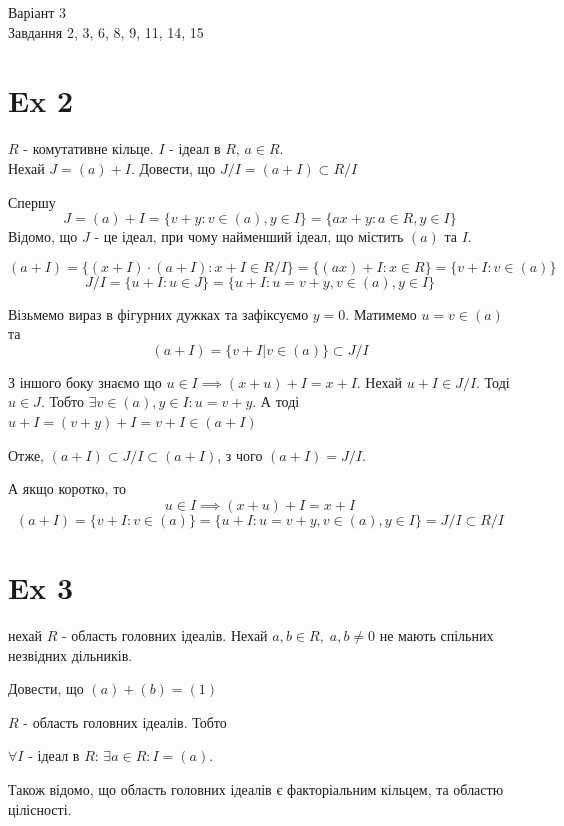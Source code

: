 \documentclass[11pt, a4paper]{article} %
\begin{document}
\begin{mdframed}[backgroundcolor=pink!30]
    Варіант 3\\
    Завдання 2, 3, 6, 8, 9, 11, 14, 15
\end{mdframed}

\section*{Ex 2}
\begin{mdframed}
    $R$ - комутативне кільце. $I$ - ідеал в $R$, $a\in R$.\\
    Нехай $J = (a) + I$. Довести, що $J/I = (a+I) \subset R/I$
\end{mdframed}
Спершу
\[J = (a) + I = \{v+y : v \in (a), y \in I\} = \{ax+y : a \in R, y \in I\}\]
Відомо, що $J$ - це ідеал, при чому найменший ідеал, що містить $(a)$ та $I$.

\[(a+I) = \{(x+I)\cdot (a+I) : x+I \in R/I\} = \{(ax)+I : x \in R\} = \{v+I : v \in (a)\}\]
\[J/I = \{u + I : u \in J\} = \{u + I : u = v+y, v \in (a), y \in I\} \]

Візьмемо вираз в фігурних дужках та зафіксуємо $y=0$. 
Матимемо $u = v \in (a)$ та 
\[(a+I) = \{v + I | v \in (a)\} \subset J/I\]

З іншого боку знаємо що $u\in I \implies (x+u) + I = x + I$.
Нехай $u+I \in J/I$.
Тоді $u \in J$. Тобто $\exists v \in (a), y \in I: u=v+y$. 
А тоді $u+I = (v + y) + I = v + I \in (a+I)$

Отже, $(a+I) \subset J/I \subset (a+I)$, з чого $(a+I) = J/I$.

А якщо коротко, то 
\[u\in I \implies (x+u) + I = x + I\]
\[(a+I) = \{v+I : v \in (a)\} = \{u+I : u = v + y, v \in (a), y \in I\} = J/I \subset R/I\]


\newpage
\section*{Ex 3}
\begin{mdframed}
    нехай $R$ - область головних ідеалів.
    Нехай $a,b\in R, \; a,b\ne 0$ не мають спільних незвідних дільників.
    
    Довести, що $(a)+(b)=(1)$
\end{mdframed}

\begin{mdframed}[backgroundcolor=purple!20]
    $R$ - область головних ідеалів.
    Тобто 

    $\forall I$ - ідеал в $R$: $\exists a\in R: I =(a)$.
    
    Також відомо, що область головних ідеалів є факторіальним кільцем, та областю цілісності.
\end{mdframed}
\end{document}
